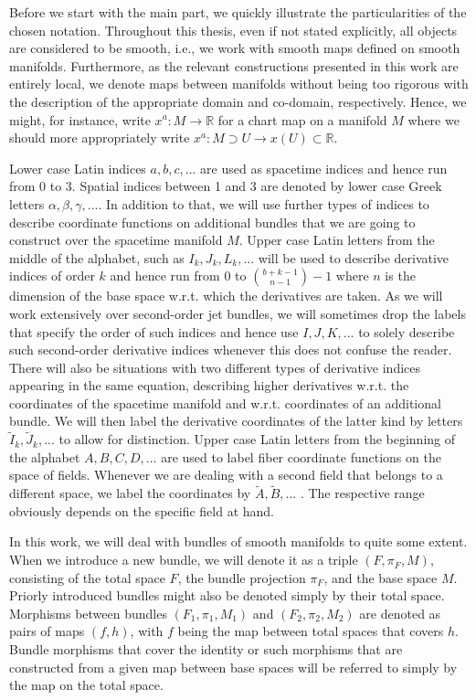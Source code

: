 Before we start with the main part, we quickly illustrate the particularities of the chosen notation. Throughout this thesis, even if not stated explicitly, all objects are considered to be smooth, i.e., we work with smooth maps defined on smooth manifolds. 
Furthermore, as the relevant constructions presented in this work are entirely local, we denote maps between manifolds without being too rigorous with the description of the appropriate domain and co-domain, respectively. Hence, we might, for instance, write $x^a : M
\rightarrow \mathbb{R}$ for a chart map on a manifold $M$ where we should more appropriately write $x^a : M \supset U  \rightarrow x(U) \subset \mathbb{R} $. 

Lower case Latin indices $a,b,c,...$ are used as spacetime indices and hence run from 0 to 3. Spatial indices between 1 and 3 are denoted by lower case Greek letters $\alpha,\beta,\gamma,...$. In addition to that, we will use further types of indices to describe coordinate functions on additional bundles that we are going to construct over the spacetime manifold $M$. Upper case Latin letters from the middle of the alphabet, such as $I_k,J_k,L_k,...$ will be used to describe derivative indices of order $k$ and hence run from $0$ to $\binom{b+k-1}{n-1}-1$ where $n$ is the dimension of the base space w.r.t. which the derivatives are taken. As we will work extensively over second-order jet bundles, we will sometimes drop the labels that specify the order of such indices and hence use $I,J,K,...$ to solely describe such second-order derivative indices whenever this does not confuse the reader.
There will also be situations with two different types of derivative indices appearing in the same equation, describing higher derivatives w.r.t. the coordinates of the spacetime manifold and w.r.t. coordinates of an additional bundle. We will then label the derivative coordinates of the latter kind by letters $\tilde{I}_k, \tilde{J}_k,...$ to allow for distinction.
Upper case Latin letters from the beginning of the alphabet $A,B,C,D,...$ are used to label fiber coordinate functions on the space of fields. Whenever we are dealing with a second field that belongs to a different space, we label the coordinates by $\tilde{A}, \tilde{B},...$ . The respective range obviously depends on the specific field at hand.

In this work, we will deal with bundles of smooth manifolds to quite some extent. When we introduce a new bundle, we will denote it as a triple $(F,\pi_F,M)$, consisting of the total space $F$, the bundle projection $\pi_F$, and the base space $M$. Priorly introduced bundles might also be denoted simply by their total space. Morphisms between bundles $(F_1,\pi_1,M_1)$ and $(F_2,\pi_2,M_2)$ are denoted as pairs of maps $(f,h)$, with $f$ being the map between total spaces that covers $h$. Bundle morphisms that cover the identity or such morphisms that are constructed from a given map between base spaces will be referred to simply by the map on the total space.


